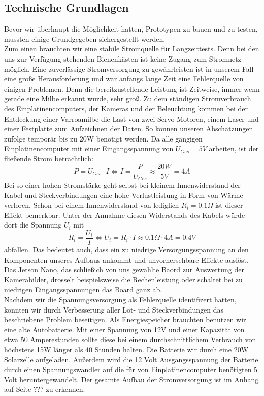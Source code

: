 \documentclass[11pt,a4paper]{article}
\begin{document}
\subsection{Technische Grundlagen}
Bevor wir überhaupt die Möglichkeit hatten, Prototypen zu bauen und zu testen, mussten einige Grundgegeben sichergestellt werden.\\
Zum einen brauchten wir eine stabile Stromquelle für Langzeittests. Denn bei den uns zur Verfügung stehenden Bienenkästen ist keine Zugang zum Stromnetz möglich. Eine zuverlässige Stromversorgung zu gewährleisten ist in unserem Fall eine große Herausforderung und war anfangs lange Zeit eine Fehlerquelle von einigen Problemen. Denn die bereitzustellende Leistung ist Zeitweise, immer wenn gerade eine Milbe erkannt wurde, sehr groß. Zu dem ständigen Stromverbrauch des Einplatinencomputers, der Kameras und der Beleuchtung kommen bei der Entdeckung einer Varroamilbe die Last von zwei Servo-Motoren, einem Laser und einer Festplatte zum Aufzeichnen der Daten. So können unseren Abschätzungen zufolge temporär bis zu 20W benötigt werden. Da alle gängigen Einplatinencomputer mit einer Eingangsspannung von $U_{Ges} = 5V$ arbeiten, ist der fließende Strom beträchtlich:
$$ P = U_{Ges} \cdot I \Longleftrightarrow I = \dfrac{P}{U_{Ges}} \approx \dfrac{20W}{5V} = 4A$$
Bei so einer hohen Stromstärke geht selbst bei kleinem Innenwiderstand der Kabel und Steckverbindungen eine hohe Verlustleistung in Form von Wärme verloren. Schon bei einem Innenwiderstand von lediglich $R_i = 0.1\varOmega$ ist dieser Effekt bemerkbar. Unter der Annahme diesen Widerstands des Kabels würde dort die Spannung $U_i$ mit
$$R_i = \dfrac{U_i}{I} \Longleftrightarrow U_i = R_i \cdot I \approx 0.1\varOmega \cdot 4A = 0.4V$$
abfallen. Das bedeutet auch, dass ein zu niedrige Versorgungsspannung an den Komponenten unseres Aufbaus ankommt und unvorhersehbare Effekte auslöst. Das Jetson Nano, das schließich von uns gewählte Baord zur Auswertung der Kamerabilder, drosselt beispielsweise die Rechenleistung oder schaltet bei zu niedrigen Eingangsspannungen das Board ganz ab.\\
Nachdem wir die Spannungsversorgung als Fehlerquelle identifizert hatten, konnten wir durch Verbesserung aller Löt- und Steckverbindungen das beschriebene Problem beseitigen. 
Als Energiespeicher brauchten benutzen wir eine alte Autobatterie. Mit einer Spannung von 12V und einer Kapazität von etwa 50 Amperestunden sollte diese bei einem durchschnittlichem Verbrauch von höchstens 15W länger als 40 Stunden halten. Die Batterie wir durch eine 20W Solarzelle aufgeladen. Außerdem wird die 12 Volt Ausgangsspannung der Batterie durch einen Spannungswandler auf die für von Einplatinencomputer benötigten 5 Volt heruntergewandelt. Der gesamte Aufbau der Stromversorgung ist im Anhang auf Seite ??? zu erkennen.\\
\end{document}
